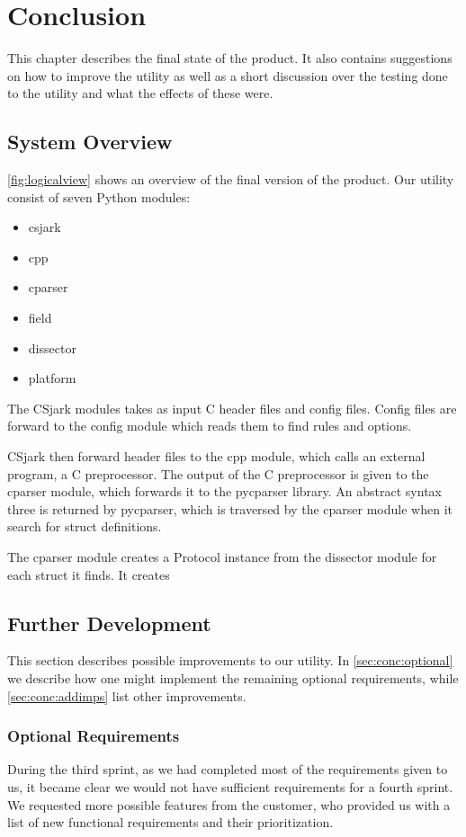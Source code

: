 \chapter{Conclusion}
\label{cha:conclusion}
This chapter describes the final state of the product.
It also contains suggestions on how to improve the utility as well as a short discussion over the testing done to the utility and what the effects of these were.


\section{System Overview}
\autoref{fig:logicalview} shows an overview of the final version of the
product. Our utility consist of seven Python modules:
\begin{itemize}
	\item csjark
	\item cpp
	\item cparser
	\item field
	\item dissector
	\item platform
\end{itemize}
The CSjark modules takes as input C header files and config files. Config
files are forward to the config module which reads them to find rules and
options.

CSjark then forward header files to the cpp module, which calls an external
program, a C preprocessor. The output of the C preprocessor is given to the
cparser module, which forwards it to the pycparser library. An abstract
syntax three is returned by pycparser, which is traversed by the cparser
module when it search for struct definitions.

The cparser module creates a Protocol instance from the dissector module for
each struct it finds. It creates 

\section{Further Development}
\label{sec:eval:furtherdev}
This section describes possible improvements to our utility.
In \autoref{sec:conc:optional} we describe how one might implement the remaining
optional requirements, while \autoref{sec:conc:addimps} list other improvements.

\subsection{Optional Requirements}
\label{sec:conc:optional}
During the third sprint, as we had completed most of the requirements given to
us, it became clear we would not have sufficient requirements for a fourth
sprint. We requested more possible features from the customer, who provided us
with a list of new functional requirements and their prioritization.

